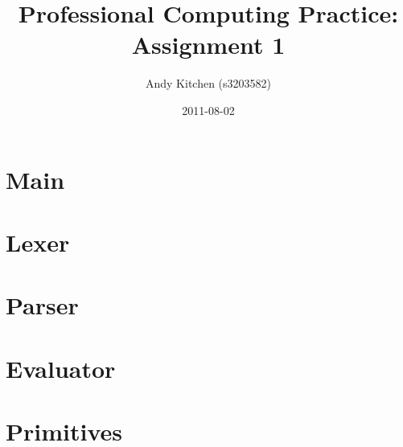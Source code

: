 \documentclass[]{article}
\title{Professional Computing Practice: Assignment 1}
\author{Andy Kitchen (s3203582)}
\date{2011-08-02}
\begin{document}
\maketitle

\section{Main}


\section{Lexer}


\section{Parser}


\section{Evaluator}


\section{Primitives}


%
%
\end{document}
